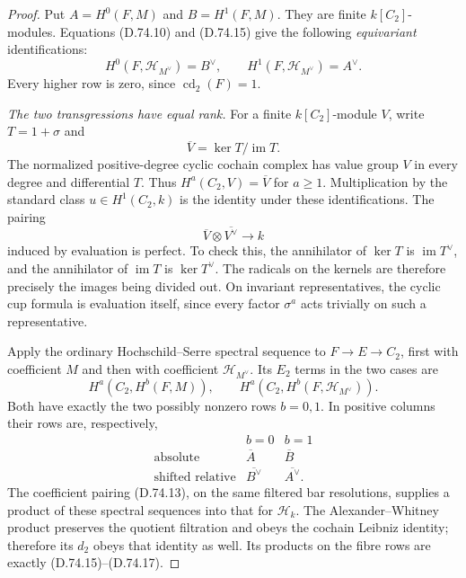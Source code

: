 \begin{proof}
Put $A=H^0(F,M)$ and $B=H^1(F,M)$.  They are finite
$k[C_2]$-modules.  Equations (D.74.10) and (D.74.15)
give the following \emph{equivariant} identifications:
\[
 H^0(F,\mathscr H_{M^\vee})=B^\vee,\qquad
 H^1(F,\mathscr H_{M^\vee})=A^\vee .
 \tag{D.74.17}
\]
Every higher row is zero, since $\operatorname{cd}_2(F)=1$.

\emph{The two transgressions have equal rank.}
For a finite $k[C_2]$-module $V$, write
$T=1+\sigma$ and
\[
                 \overline V=\ker T/\operatorname{im}T .
 \tag{D.74.18}
\]
The normalized positive-degree cyclic cochain complex
has value group $V$ in every degree and differential
$T$.  Thus $H^a(C_2,V)=\overline V$ for $a\geq1$.
Multiplication by the standard class
$u\in H^1(C_2,k)$ is the identity under these
identifications.  The pairing
\[
              \overline V\otimes\overline{V^\vee}
                         \longrightarrow k
 \tag{D.74.19}
\]
induced by evaluation is perfect.  To check this,
the annihilator of $\ker T$ is $\operatorname{im}T^\vee$,
and the annihilator of $\operatorname{im}T$ is
$\ker T^\vee$.  The radicals on the kernels are
therefore precisely the images being divided out.
On invariant representatives, the cyclic cup formula
is evaluation itself, since every factor $\sigma^a$
acts trivially on such a representative.

Apply the ordinary Hochschild--Serre spectral sequence
to $F\to E\to C_2$, first with coefficient $M$ and
then with coefficient $\mathscr H_{M^\vee}$.
Its $E_2$ terms in the two cases are
\[
 H^a(C_2,H^b(F,M)),\qquad
 H^a(C_2,H^b(F,\mathscr H_{M^\vee})).
 \tag{D.74.20}
\]
Both have exactly the two possibly nonzero rows
$b=0,1$.  In positive columns their rows are,
respectively,
\[
 \begin{array}{c|cc}
       &b=0&b=1\\ \hline
 \text{absolute}&\overline A&\overline B\\
 \text{shifted relative}&\overline{B^\vee}&\overline{A^\vee}.
 \end{array}
 \tag{D.74.21}
\]
The coefficient pairing (D.74.13), on the same filtered
bar resolutions, supplies a product of these spectral
sequences into that for $\mathscr H_k$.  The
Alexander--Whitney product preserves the quotient
filtration and obeys the cochain Leibniz identity;
therefore its $d_2$ obeys that identity as well.
Its products on the fibre rows are exactly
(D.74.15)--(D.74.17).


\end{proof}
